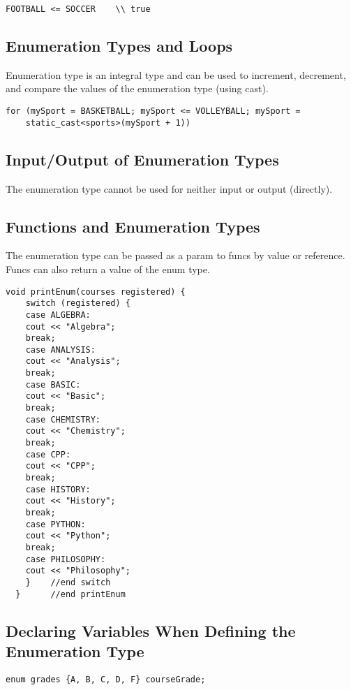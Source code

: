 \documentclass{article}
\begin{document}
\begin{lstlisting}[caption={Enumeration Type Relational Operator Example}]
  FOOTBALL <= SOCCER    \\ true
\end{lstlisting}

\subsection{Enumeration Types and Loops}
Enumeration type is an integral type and can be used to increment, decrement,
and compare the values of the enumeration type (using cast).

\begin{lstlisting}[caption={Enumeration Type Loop}]
  for (mySport = BASKETBALL; mySport <= VOLLEYBALL; mySport = 
    static_cast<sports>(mySport + 1))
\end{lstlisting}

\subsection{Input/Output of Enumeration Types}
The enumeration type cannot be used for neither input or output (directly).

\subsection{Functions and Enumeration Types}
The enumeration type can be passed as a param to funcs by value or reference.
Funcs can also return a value of the enum type.

\begin{lstlisting}[caption={\texttt{enum} Types in Functions}]
  void printEnum(courses registered) {
    switch (registered) {
    case ALGEBRA:
    cout << "Algebra";
    break;
    case ANALYSIS:
    cout << "Analysis";
    break;
    case BASIC:
    cout << "Basic";
    break;
    case CHEMISTRY:
    cout << "Chemistry";
    break;
    case CPP:
    cout << "CPP";
    break;
    case HISTORY:
    cout << "History";
    break;
    case PYTHON:
    cout << "Python";
    break;
    case PHILOSOPHY:
    cout << "Philosophy";
    }    //end switch
  }      //end printEnum
\end{lstlisting}

\subsection{Declaring Variables When Defining the Enumeration Type}
\begin{lstlisting}[caption={Simultaneous \texttt{enum} Declaration and Variable
Declaration}]
  enum grades {A, B, C, D, F} courseGrade;
\end{lstlisting}
\end{document}

